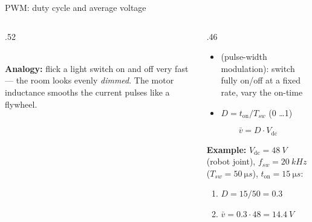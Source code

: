 \documentclass[aspectratio=169,10pt]{beamer}
\begin{document}
\begin{frame}{PWM: duty cycle and average voltage}
\begin{columns}[T]
\begin{column}{.52\textwidth}
\centering
{}\\[3mm]
\small \textbf{Analogy:} flick a light switch on and off very fast --- the room looks evenly \emph{dimmed}. The motor inductance smooths the current pulses like a flywheel.
\end{column}
\begin{column}{.46\textwidth}
\small
\begin{itemize}\setlength\itemsep{.4mm}
\item {} (pulse-width modulation): switch fully on/off at a fixed rate, vary the on-time
\item {} $D=t_\text{on}/T_{sw}$ (0 \ldots 1)
\end{itemize}
\begin{eqbox}
\[ \bar v = D\cdot V_\text{dc} \]
\end{eqbox}
\textbf{Example:} $V_\text{dc}=\SI{48}{V}$ (robot joint), $f_{sw}=\SI{20}{kHz}$ ($T_{sw}=\SI{50}{\micro s}$), $t_\text{on}=\SI{15}{\micro s}$:
\begin{enumerate}\setlength\itemsep{.2mm}
\item $D=15/50=0.3$
\item $\bar v=0.3\cdot48=\SI{14.4}{V}$
\end{enumerate}
\end{column}
\end{columns}
\end{frame}
\end{document}
